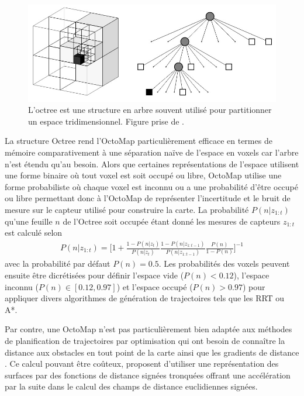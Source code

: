 \begin{figure}[h]
  \centering
  \includegraphics[width=0.5\linewidth]{images/octree.jpg}
  \caption[Représentation graphique d'une Octree]{L'octree est une structure en arbre souvent utilisé pour partitionner un espace tridimensionnel. Figure prise de \citep{Hornung2013}.}
  \label{fig:octree}
\end{figure}

La structure Octree rend l'OctoMap particulièrement efficace en termes de mémoire comparativement à une séparation naïve de l'espace en voxels car l'arbre n'est étendu qu'au besoin. Alors que certaines représentations de l'espace utilisent une forme binaire où tout voxel est soit occupé ou libre, OctoMap utilise une forme probabiliste où chaque voxel est inconnu ou a une probabilité d'être occupé ou libre permettant donc à l'OctoMap de représenter l'incertitude et le bruit de mesure sur le capteur utilisé pour construire la carte. La probabilité $P(n|z_{1:t})$ qu'une feuille $n$ de l'Octree soit occupée étant donné les mesures de capteurs $z_{1:t}$ est calculé selon
\begin{align}
  P(n|z_{1:t}) = \Bigg[ 1 +
    \frac{1 - P(n|z_{t})}{P(n|z_{t})}
    \frac{1 - P(n|z_{1:t-1})}{P(n|z_{1:t-1})}
    \frac{P(n)}{1 - P(n)}
  \Bigg]^{-1}
  \label{eq:octomap_probability}
\end{align}
avec la probabilité par défaut $P(n) = 0.5$. Les probabilités des voxels peuvent ensuite être dicrétisées pour définir l'espace vide ($P(n) < 0.12$), l'espace inconnu ($P(n) \in [0.12, 0.97]$) et l'espace occupé ($P(n) > 0.97$) pour appliquer divers algorithmes de génération de trajectoires tels que les RRT ou A*.

Par contre, une OctoMap n'est pas particulièrement bien adaptée aux méthodes de planification de trajectoires par optimisation qui ont besoin de connaître la distance aux obstacles en tout point de la carte ainsi que les gradients de distance \citep{ratliff2009chomp, Oleynikova2016}. Ce calcul pouvant être coûteux, \cite{oleynikova2017voxblox} proposent d'utiliser une représentation des surfaces par des fonctions de distance signées tronquées offrant une accélération par la suite dans le calcul des champs de distance euclidiennes signées.

